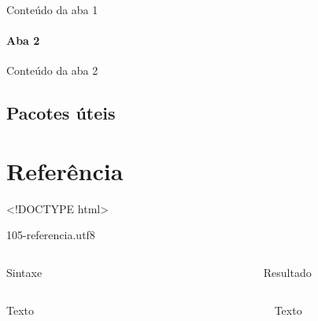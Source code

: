 \documentclass[
]{book}
\begin{document}
Conteúdo da aba 1

\hypertarget{aba-2}{%
\subsubsection{Aba 2}\label{aba-2}}

Conteúdo da aba 2

\hypertarget{pacotes-uxfateis}{%
\section{Pacotes úteis}\label{pacotes-uxfateis}}

\hypertarget{referuxeancia}{%
\chapter{Referência}\label{referuxeancia}}

\textless!DOCTYPE html\textgreater{}

105-referencia.utf8

\hypertarget{header}{}
\begin{fluid-row}

\end{fluid-row}

\begin{columns}

\begin{column}

Sintaxe

\end{column}

\begin{column}

~

\end{column}

\begin{column}

Resultado

\end{column}

\end{columns}

\begin{columns}

\begin{column}

Texto

\end{column}

\begin{column}

~

\end{column}

\begin{column}

Texto

\end{column}

\end{columns}
\end{document}
